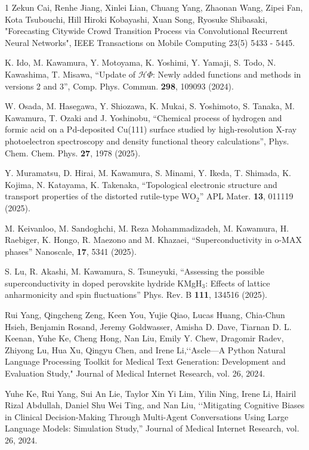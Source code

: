 \begin{雑誌論文}{1}
Zekun Cai, Renhe Jiang, Xinlei Lian, Chuang Yang, Zhaonan Wang, Zipei Fan, Kota Tsubouchi, Hill Hiroki Kobayashi, Xuan Song, Ryosuke Shibasaki,  "Forecasting Citywide Crowd Transition Process via Convolutional Recurrent Neural Networks", IEEE Transactions on Mobile Computing 23(5) 5433 - 5445.

K. Ido, M. Kawamura, Y. Motoyama, K. Yoshimi, Y. Yamaji, S. Todo, N. Kawashima, T. Misawa, 
``Update of $\mathcal{H}\Phi$: Newly added functions and methods in versions 2 and 3'',
Comp. Phys. Commun. \textbf{298}, 109093 (2024).

W. Osada, M. Hasegawa, Y. Shiozawa, K. Mukai, S. Yoshimoto, S. Tanaka, M. Kawamura, T. Ozaki and J. Yoshinobu, 
``Chemical process of hydrogen and formic acid on a Pd-deposited Cu(111) surface studied by high-resolution X-ray photoelectron spectroscopy and density functional theory calculations'',
Phys. Chem. Chem. Phys. \textbf{27}, 1978 (2025).

Y. Muramatsu, D. Hirai, M. Kawamura, S. Minami, Y. Ikeda, T. Shimada, K. Kojima, N. Katayama, K. Takenaka, 
``Topological electronic structure and transport properties of the distorted rutile-type WO$_2$''
APL Mater. \textbf{13}, 011119 (2025).

M. Keivanloo, M. Sandoghchi, M. Reza Mohammadizadeh, M. Kawamura, H. Raebiger, K. Hongo, R. Maezono and M. Khazaei, 
``Superconductivity in o-MAX phases''
Nanoscale, \textbf{17}, 5341 (2025).

S. Lu, R. Akashi, M. Kawamura, S. Tsuneyuki, 
``Assessing the possible superconductivity in doped perovskite hydride KMgH$_3$: Effects of lattice anharmonicity and spin fluctuations''
Phys. Rev. B \textbf{111}, 134516 (2025).

Rui Yang, Qingcheng Zeng, Keen You, Yujie Qiao, Lucas Huang, Chia-Chun Hsieh, Benjamin Rosand, Jeremy Goldwasser, Amisha D. Dave, Tiarnan D. L. Keenan, Yuhe Ke, Cheng Hong, Nan Liu, Emily Y. Chew, Dragomir Radev, Zhiyong Lu, Hua Xu, Qingyu Chen, and Irene Li,\lq\lq Ascle—A Python Natural Language Processing Toolkit for Medical Text Generation: Development and Evaluation Study," Journal of Medical Internet Research, vol. 26, 2024.


Yuhe Ke, Rui Yang, Sui An Lie, Taylor Xin Yi Lim, Yilin Ning, Irene Li, Hairil Rizal Abdullah, Daniel Shu Wei Ting, and Nan Liu, \lq\lq Mitigating Cognitive Biases in Clinical Decision-Making Through Multi-Agent Conversations Using Large Language Models: Simulation Study,” Journal of Medical Internet Research, vol. 26, 2024.


\end{雑誌論文}

